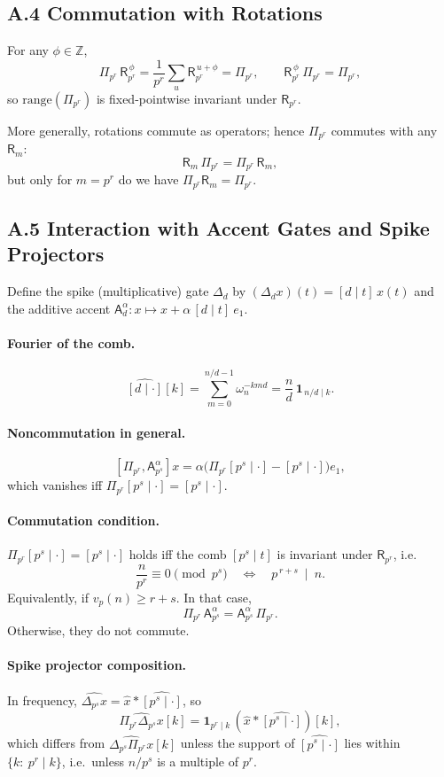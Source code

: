 \documentclass[12pt]{article}
\numberwithin{equation}{section}
\theoremstyle{plain}
\theoremstyle{definition}
\theoremstyle{remark}
\begin{document}
\subsection*{A.4 Commutation with Rotations}
For any $\phi\in\mathbb{Z}$,
\[
\Pi_{p^r}\,\mathsf{R}_{p^r}^{\,\phi}=\frac{1}{p^r}\sum_{u}\mathsf{R}_{p^r}^{\,u+\phi}=\Pi_{p^r},\qquad
\mathsf{R}_{p^r}^{\,\phi}\,\Pi_{p^r}=\Pi_{p^r},
\]
so $\mathrm{range}(\Pi_{p^r})$ is fixed-pointwise invariant under $\mathsf{R}_{p^r}$.

More generally, rotations commute as operators; hence $\Pi_{p^r}$ commutes with any $\mathsf{R}_m$:
\[
\mathsf{R}_m\,\Pi_{p^r}=\Pi_{p^r}\,\mathsf{R}_m,
\]
but only for $m=p^r$ do we have $\Pi_{p^r}\mathsf{R}_m=\Pi_{p^r}$.

\subsection*{A.5 Interaction with Accent Gates and Spike Projectors}
Define the spike (multiplicative) gate $\Delta_{d}$ by $(\Delta_{d}x)(t)=[d\mid t]\,x(t)$ and the additive accent $\mathsf{A}_{d}^{\alpha}: x\mapsto x+\alpha\,[d\mid t]\ e_1$.

\paragraph{Fourier of the comb.}
\[
\widehat{[d\mid \cdot]}[k]=\sum_{m=0}^{n/d-1}\omega_n^{-k md}=\frac{n}{d}\,\mathbf{1}_{\,n/d\mid k}.
\]

\paragraph{Noncommutation in general.}
\[
[\Pi_{p^r},\mathsf{A}_{p^s}^{\alpha}]x
=\alpha\Big(\Pi_{p^r}[p^s\mid \cdot]-[p^s\mid \cdot]\Big)e_1,
\]
which vanishes iff $\Pi_{p^r}[p^s\mid \cdot]=[p^s\mid \cdot]$.

\paragraph{Commutation condition.}
$\Pi_{p^r}[p^s\mid \cdot]=[p^s\mid \cdot]$ holds iff the comb $[p^s\mid t]$ is invariant under $\mathsf{R}_{p^r}$, i.e.
\[
\frac{n}{p^r}\equiv 0\pmod{p^s}\quad\Longleftrightarrow\quad p^{\,r+s}\ \mid\ n.
\]
Equivalently, if $v_p(n)\ge r+s$. In that case,
\[
\Pi_{p^r}\,\mathsf{A}_{p^s}^{\alpha}=\mathsf{A}_{p^s}^{\alpha}\,\Pi_{p^r}.
\]
Otherwise, they do not commute.

\paragraph{Spike projector composition.}
In frequency, $\widehat{\Delta_{p^s}x}=\widehat{x}\ast \widehat{[p^s\mid \cdot]}$, so
\[
\widehat{\Pi_{p^r}\Delta_{p^s}x}[k]=\mathbf{1}_{p^r\mid k}\,(\widehat{x}\ast \widehat{[p^s\mid \cdot]})[k],
\]
which differs from $\widehat{\Delta_{p^s}\Pi_{p^r}x}[k]$ unless the support of $\widehat{[p^s\mid \cdot]}$ lies within $\{k:\ p^r\mid k\}$, i.e.\ unless $n/p^s$ is a multiple of $p^r$.
\end{document}
